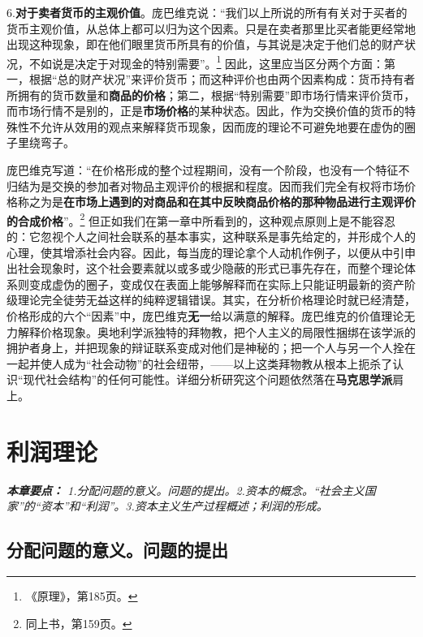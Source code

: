 \documentclass[fontset=fandol, a4paper, 12pt, openright]{ctexbook}
\renewenvironment{quote}
  {\list{}{\rightmargin\leftmargin}%
   \item\relax\small\itshape\color{darkgray}}
  {\endlist}
\begin{document}
6.\textbf{对于卖者货币的主观价值}。庞巴维克说：“我们以上所说的所有有关对于买者的货币主观价值，从总体上都可以归为这个因素。只是在卖者那里比买者能更经常地出现这种现象，即在他们眼里货币所具有的价值，与其说是决定于他们总的财产状况，不如说是决定于对现金的特别需要”。\footnote{《原理》，第185页。} 因此，这里应当区分两个方面：第一，根据“总的财产状况”来评价货币；而这种评价也由两个因素构成：货币持有者所拥有的货币数量和\textbf{商品的价格}；第二，根据“特别需要”即市场行情来评价货币，而市场行情不是别的，正是\textbf{市场价格}的某种状态。因此，作为交换价值的货币的特殊性不允许从效用的观点来解释货币现象，因而庞的理论不可避免地要在虚伪的圈子里绕弯子。

庞巴维克写道：“在价格形成的整个过程期间，没有一个阶段，也没有一个特征不归结为是交换的参加者对物品主观评价的根据和程度。因而我们完全有权将市场价格称之为是\textbf{在市场上遇到的对商品和在其中反映商品价格的那种物品进行主观评价的合成价格}”。\footnote{同上书，第159页。} 但正如我们在第一章中所看到的，这种观点原则上是不能容忍的：它忽视个人之间社会联系的基本事实，这种联系是事先给定的，并形成个人的心理，使其增添社会内容。因此，每当庞的理论拿个人动机作例子，以便从中引申出社会现象时，这个社会要素就以或多或少隐蔽的形式已事先存在，而整个理论体系则变成虚伪的圈子，变成仅在表面上能够解释而在实际上只能证明最新的资产阶级理论完全徒劳无益这样的纯粹逻辑错误。其实，在分析价格理论时就已经清楚，价格形成的六个“因素”中，庞巴维克\textbf{无一}给以满意的解释。庞巴维克的价值理论无力解释价格现象。奥地利学派独特的拜物教，把个人主义的局限性捆绑在该学派的拥护者身上，并把现象的辩证联系变成对他们是神秘的；把一个人与另一个人拴在一起并使人成为“社会动物”的社会纽带，——以上这类拜物教从根本上扼杀了认识“现代社会结构”的任何可能性。详细分析研究这个问题依然落在\textbf{马克思学派}肩上。


\chapter{利润理论}

\begin{quote}
\small
\textbf{本章要点：} 1.分配问题的意义。问题的提出。2.资本的概念。“社会主义国家”的“资本”和“利润”。3.资本主义生产过程概述；利润的形成。
\end{quote}

\section{分配问题的意义。问题的提出}
\end{document}
